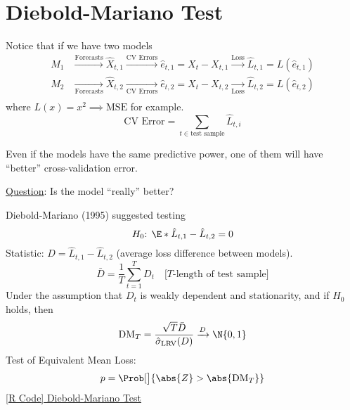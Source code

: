 \section{Diebold-Mariano Test}
Notice that if we have two models
\begin{align*}
    M_1 & \xrightarrow{\text{Forecasts}} \hat{X}_{t,1} \xrightarrow{\text{CV Errors}} \hat{e}_{t,1}=X_t-X_{t,1} \xrightarrow{\text{Loss}} \hat{L}_{t,1}=L(\hat{e}_{t,1})     \\
    M_2 & \xrightarrow[\text{Forecasts}]{}\hat{X}_{t,2}\xrightarrow[\text{CV Errors}]{} \hat{e}_{t,2}=X_t-X_{t,2} \xrightarrow[\text{Loss}]{} \hat{L}_{t,2}=L(\hat{e}_{t,2}) \\
\end{align*}
where $ L(x)=x^2 \implies \text{MSE} $ for example.
\[ \text{CV Error}=\sum_{t\in\text{test sample}}\hat{L}_{t,i}  \]
\begin{Remark}{}{}
    Even if the models have the same predictive power, one of them will have ``better''
    cross-validation error.

    \underline{Question}: Is the model ``really'' better?
\end{Remark}
Diebold-Mariano (1995) suggested testing
\[ \text{$H_0$: }\E*{\hat{L}_{t,1}-\hat{L}_{t,2}}=0 \]
Statistic: $ D=\hat{L}_{t,1}-\hat{L}_{t,2} $ (average loss difference between models).
\[ \bar{D}=\frac{1}{T} \sum_{t=1}^{T} D_t\quad\text{[$T$-length of test sample]} \]
Under the assumption that $ D_t $ is weakly dependent and stationarity, and if $ H_0 $
holds, then
\[ \text{DM}_T=\frac{\sqrt{T}\bar{D}}{\hat{\sigma}_{\text{LRV}}(D)}\xrightarrow{D}\N{0,1}  \]
Test of Equivalent Mean Loss:
\[ p=\Prob[\big]{\abs{Z}>\abs{\text{DM}_T}} \]
\href{https://github.com/Hextical/university-notes/blob/master/year-3/semester-2/STAT%20443/code/10.6%20-%20Diebold%20Mariano%20Test.R}{[R Code] Diebold-Mariano Test}
